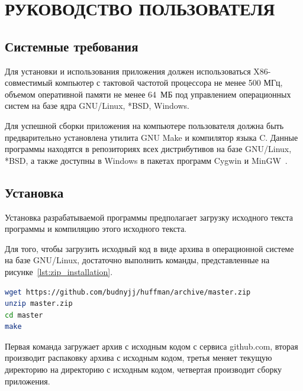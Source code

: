 \section[Руководство пользователя]{РУКОВОДСТВО ПОЛЬЗОВАТЕЛЯ}
\label{sec:user_manual}

\subsection{Системные требования}

Для установки и использования приложения должен использоваться 
X86-совместимый компьютер с тактовой частотой процессора не менее 500 МГц,
объемом оперативной памяти не менее 64~МБ под управлением операционных систем
на базе ядра GNU/Linux, *BSD, Windows.

Для успешной сборки приложения на компьютере пользователя должна быть
предварительно установлена утилита GNU Make и компилятор языка C.
Данные программы находятся в репозиториях всех дистрибутивов на базе GNU/Linux,
*BSD, а также доступны в Windows в пакетах программ 
Cygwin и MinGW~\cite{cygwin, mingw}.

\subsection{Установка}

Установка разрабатываемой программы предполагает загрузку исходного текста
программы и компиляцию этого исходного текста.


Для того, чтобы загрузить исходный код в виде архива в операционной системе 
на базе GNU/Linux, достаточно выполнить
команды, представленные на рисунке~\ref{lst:zip_installation}.

\begin{lstlisting}[basicstyle=\scriptsize\ttfamily,
                   numberstyle=\scriptsize\ttfamily,
                   xleftmargin=7mm,
                   language=bash,
                   caption=Команды установки архиватора \\ 
                   без создания репозитория,
                   label=lst:zip_installation]
wget https://github.com/budnyjj/huffman/archive/master.zip
unzip master.zip
cd master
make
\end{lstlisting}

Первая команда загружает архив с исходным кодом с сервиса github.com,
вторая производит распаковку архива с исходным кодом,
третья меняет текущую директорию на директорию с исходным кодом,
четвертая производит сборку приложения.

